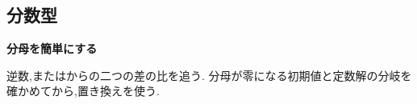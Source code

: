 \subsection{分数型}\label{節：分数型}
\begin{bookpoint}
  \textbf{分母を簡単にする}\par
  逆数,またはからの二つの差の比を追う.
  分母が零になる初期値と定数解の分岐を確かめてから,置き換えを使う.
\end{bookpoint}



